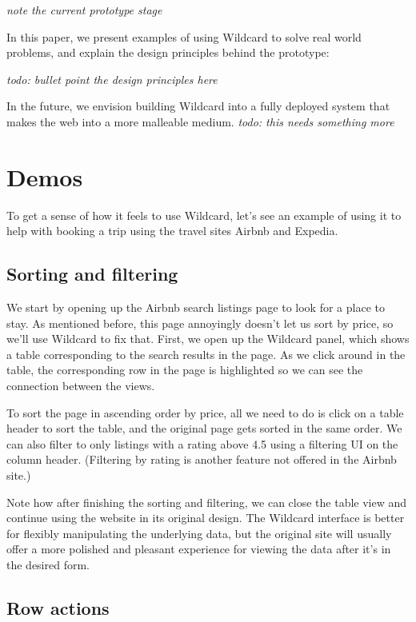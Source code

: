 \documentclass[english,submission]{programming}
\begin{document}
\emph{note the current prototype stage}

In this paper, we present examples of using Wildcard to solve real world
problems, and explain the design principles behind the prototype:

\emph{todo: bullet point the design principles here}

In the future, we envision building Wildcard into a fully deployed
system that makes the web into a more malleable medium. \emph{todo: this
needs something more}

\hypertarget{demos}{%
\section{Demos}\label{demos}}

To get a sense of how it feels to use Wildcard, let's see an example of
using it to help with booking a trip using the travel sites Airbnb and
Expedia.

\hypertarget{sorting-and-filtering}{%
\subsection{Sorting and filtering}\label{sorting-and-filtering}}

We start by opening up the Airbnb search listings page to look for a
place to stay. As mentioned before, this page annoyingly doesn't let us
sort by price, so we'll use Wildcard to fix that. First, we open up the
Wildcard panel, which shows a table corresponding to the search results
in the page. As we click around in the table, the corresponding row in
the page is highlighted so we can see the connection between the views.

To sort the page in ascending order by price, all we need to do is click
on a table header to sort the table, and the original page gets sorted
in the same order. We can also filter to only listings with a rating
above 4.5 using a filtering UI on the column header. (Filtering by
rating is another feature not offered in the Airbnb site.)

Note how after finishing the sorting and filtering, we can close the
table view and continue using the website in its original design. The
Wildcard interface is better for flexibly manipulating the underlying
data, but the original site will usually offer a more polished and
pleasant experience for viewing the data after it's in the desired form.

\hypertarget{row-actions}{%
\subsection{Row actions}\label{row-actions}}
\end{document}
